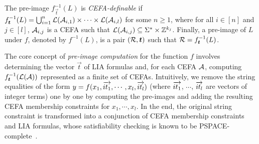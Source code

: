 {%
%
%

The pre-image $f^{-1}_{\vec{t}}(L)$ is \emph{CEFA-definable} if $f^{-1}_{\vec{t}}(L) = \bigcup_{i=1}^n \Lang(\aut_{i,1}) \times \cdots \times \Lang(\aut_{i,l})$ for some $n\ge 1$, where for all $i\in [n]$ and $j\in [l]$, $\mathcal{A}_{i,j}$ is a CEFA such that $\mathcal{L}(\mathcal{A}_{i,j})\subseteq \Sigma^* \times \mathbb{Z}^{k_j}$.  
%
Finally, a pre-image of $L$ under $f$, denoted by $f^{-1}(L)$, is a pair $(\cerl,\vec{t})$ such that $\cerl = f^{-1}_{\vec{t}}(L)$.
%

The core concept of \emph{pre-image computation} for the function $f$ involves determining the vector $\vec{t}$ of LIA formulas and, for each CEFA $\mathcal{A}$, computing $f^{-1}_{\vec{t}}(\Lang(\aut))$ represented as a finite set of CEFAs. 
%
Intuitively, we remove the string equalities of the form 
$y = f(x_1, \overrightarrow{it_1}, \cdots, x_l, \overrightarrow{it_l})$ (where $\overrightarrow{it_1}$, $\cdots$, $\overrightarrow{it_l}$ are vectors of integer terms)
one by one by computing the pre-images and adding the resulting CEFA membership constraints for $x_1, \cdots, x_l$. In the end,  the original string constraint is transformed into a conjunction of CEFA membership constraints and LIA formulas, whose satisfiability checking %
is known to be PSPACE-complete~\cite{atva2020}.
}
 

%





